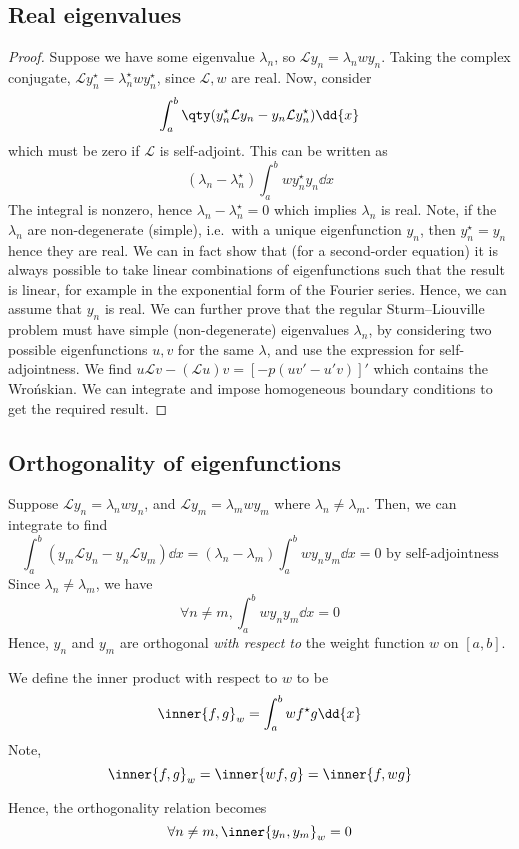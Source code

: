 \subsection{Real eigenvalues}
\begin{proof}
	Suppose we have some eigenvalue \( \lambda_n \), so \( \mathcal L y_n = \lambda_n w y_n \).
	Taking the complex conjugate, \( \mathcal L y_n^\star = \lambda_n^\star w y_n^\star \), since \( \mathcal L, w \) are real.
	Now, consider
	\[
		\int_a^b \qty(y_n^\star \mathcal L y_n - y_n \mathcal L y_n^\star) \dd{x}
	\]
	which must be zero if \( \mathcal L \) is self-adjoint.
	This can be written as
	\[
		(\lambda_n - \lambda_n^\star) \int_a^b w y_n^\star y_n \dd{x}
	\]
	The integral is nonzero, hence \( \lambda_n - \lambda_n^\star = 0 \) which implies \( \lambda_n \) is real.
	Note, if the \( \lambda_n \) are non-degenerate (simple), i.e.\ with a unique eigenfunction \( y_n \), then \( y_n^\star = y_n \) hence they are real.
	We can in fact show that (for a second-order equation) it is always possible to take linear combinations of eigenfunctions such that the result is linear, for example in the exponential form of the Fourier series.
	Hence, we can assume that \( y_n \) is real.
	We can further prove that the regular Sturm--Liouville problem must have simple (non-degenerate) eigenvalues \( \lambda_n \), by considering two possible eigenfunctions \( u, v \) for the same \( \lambda \), and use the expression for self-adjointness.
	We find \( u \mathcal L v - (\mathcal L u) v = [-p(uv' - u'v)]' \) which contains the Wro\'nskian.
	We can integrate and impose homogeneous boundary conditions to get the required result.
\end{proof}

\subsection{Orthogonality of eigenfunctions}
Suppose \( \mathcal L y_n = \lambda_n w y_n \), and \( \mathcal L y_m = \lambda_m w y_m \) where \( \lambda_n \neq \lambda_m \).
Then, we can integrate to find
\[
	\int_a^b (y_m \mathcal L y_n - y_n \mathcal L y_m) \dd{x} = (\lambda_n - \lambda_m) \int_a^b w y_n y_m \dd{x} = 0 \text{ by self-adjointness}
\]
Since \( \lambda_n \neq \lambda_m \), we have
\[
	\forall n \neq m, \int_a^b w y_n y_m \dd{x} = 0
\]
Hence, \( y_n \) and \( y_m \) are orthogonal \textit{with respect to} the weight function \( w \) on \( [a,b] \).
\begin{definition}
	We define the inner product with respect to \( w \) to be
	\[
		\inner{f,g}_w = \int_a^b w f^\star g \dd{x}
	\]
	Note,
	\[
		\inner{f,g}_w = \inner{wf,g} = \inner{f,wg}
	\]
\end{definition}
Hence, the orthogonality relation becomes
\[
	\forall n \neq m, \inner{y_n, y_m}_w = 0
\]

